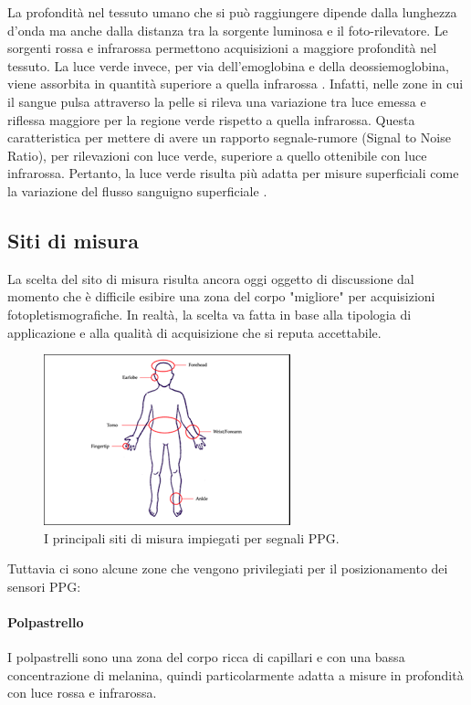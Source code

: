 La profondità nel tessuto umano che si può raggiungere dipende dalla lunghezza d'onda ma anche dalla distanza tra la sorgente luminosa e il foto-rilevatore. Le sorgenti rossa e infrarossa permettono acquisizioni a maggiore profondità nel tessuto. La luce verde invece, per via dell'emoglobina e della deossiemoglobina, viene assorbita in quantità superiore a quella infrarossa \cite{Lee2021}. Infatti, nelle zone in cui il sangue pulsa attraverso la pelle si rileva una variazione tra luce emessa e riflessa maggiore per la regione verde rispetto a quella infrarossa. Questa caratteristica per mettere di avere un rapporto segnale-rumore (Signal to Noise Ratio), per rilevazioni con luce verde, superiore a quello ottenibile con luce infrarossa. Pertanto, la luce verde risulta più adatta per misure superficiali come la variazione del flusso sanguigno superficiale \cite{Youssef2020}.
\subsection{Siti di misura}
La scelta del sito di misura risulta ancora oggi oggetto di discussione dal momento che è difficile esibire una zona del corpo "migliore" per acquisizioni fotopletismografiche. In realtà, la scelta va fatta in base alla tipologia di applicazione e alla qualità di acquisizione che si reputa accettabile.
\begin{figure}[h]
	\centering
	\includegraphics[width=0.7\linewidth]{ImageFiles/Fotopletismografia/ZoneAcquisizione}
	\caption{I principali siti di misura impiegati per segnali PPG.}
	\label{fig:ZoneAcquisizione}
\end{figure}
Tuttavia ci sono alcune zone che vengono privilegiati per il posizionamento dei sensori PPG:
	\paragraph{Polpastrello}
	 I polpastrelli sono una zona del corpo ricca di capillari e con una bassa concentrazione di melanina, quindi particolarmente adatta a misure in profondità con luce rossa e infrarossa.
